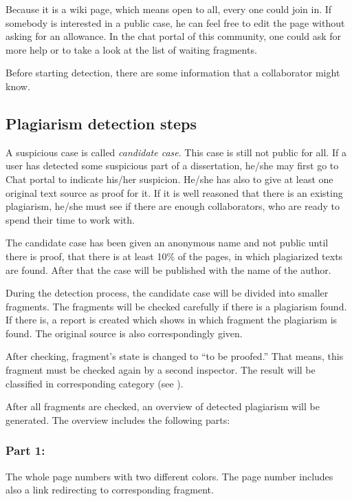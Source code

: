 Because it is a wiki page, which means open to all, every one could join in. If somebody is interested in a public 
case, he can feel free to edit the page without asking for an allowance. In the chat portal of this community, one could 
ask for more help or to take a look at the list of waiting fragments.

Before starting detection, there are some information that a collaborator might know.

\subsection{Plagiarism detection steps}
A suspicious case is called \textit{candidate case}. This case is still not public for all. If a user has detected some 
suspicious part of a dissertation, he/she may first go to Chat portal to indicate his/her suspicion. He/she has 
also to give at least one original text source as proof for it. If it is well reasoned that there is an existing 
plagiarism, he/she must see if there are enough collaborators, who are ready to spend their time to work with.

The candidate case has been given an anonymous name and not public until there is proof, that there is at 
least 10\% of the pages, in which plagiarized texts are found. After that the case will be published with the 
name of the author.

During the detection process, the candidate case will be divided into smaller fragments. The fragments will be checked 
carefully if there is a plagiarism found. If there is, a report is created which shows in which fragment the 
plagiarism is found. The original source is also correspondingly given.

After checking, fragment’s state is changed to \enquote{to be proofed.} That means, this fragment must be checked again  by a 
second inspector. The result will be classified in corresponding category (see ).

After all fragments are checked, an overview of detected plagiarism will be generated. The overview includes the following 
parts:

\subsubsection{Part 1:} 

The whole page numbers with two different colors. The page number includes also a link redirecting to corresponding 
fragment.

